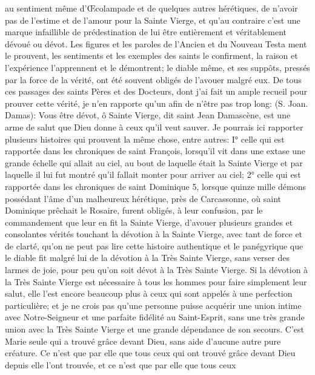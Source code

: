 au sentiment même d'Œcolampade et de quelques autres hérétiques, de n'avoir pas de l'estime et de l'amour pour
la Sainte Vierge, et qu'au contraire c'est une marque infaillible de prédestination de lui être entièrement et
véritablement dévoué ou dévot.
 Les figures et les paroles de l'Ancien et du Nouveau Testa ment le prouvent, les sentiments et les exemples
des saints le confirment, la raison et l'expérience l'apprennent et le démontrent; le diable même, et ses suppôts,
pressés par la force de la vérité, ont été souvent obligés de l'avouer malgré eux. De tous ces passages des saints
Pères et des Docteurs, dont j'ai fait un ample recueil pour prouver cette vérité, je n'en rapporte qu'un afin de n'être
pas trop long:  (S. Joan.
Damas): Vous être dévot, ô Sainte Vierge, dit saint Jean Damascène, est une arme de salut que Dieu donne à
ceux qu'il veut sauver.
 Je pourrais ici rapporter plusieurs histoires qui prouvent la même chose, entre autres: I° celle qui est rapportée
dans les chroniques de saint François, lorsqu'il vit dans une extase une grande échelle qui allait au ciel, au bout de
laquelle était la Sainte Vierge et par laquelle il lui fut montré qu'il fallait monter pour arriver au ciel; 2° celle qui est
rapportée dans les chroniques de saint Dominique 5, lorsque quinze mille démons possédant l'âme d'un
malheureux hérétique, près de Carcassonne, où saint Dominique prêchait le Rosaire, furent obligés, à leur
confusion, par le commandement que leur en fit la Sainte Vierge, d'avouer plusieurs grandes et consolantes
vérités touchant la dévotion à la Sainte Vierge, avec tant de force et de clarté, qu'on ne peut pas lire cette histoire
authentique et le panégyrique que le diable fit malgré lui de la dévotion à la Très Sainte Vierge, sans verser des
larmes de joie, pour peu qu'on soit dévot à la Très Sainte Vierge.
 Si la dévotion à la Très Sainte Vierge est nécessaire à tous les hommes pour faire simplement leur salut, elle
l'est encore beaucoup plus à ceux qui sont appelés à une perfection particulière; et je ne crois pas qu'une
personne puisse acquérir une union intime avec Notre-Seigneur et une parfaite fidélité au Saint-Esprit, sans une
très grande union avec la Très Sainte Vierge et une grande dépendance de son secours.
 C'est Marie seule qui a trouvé grâce devant Dieu, sans aide d'aucune autre pure créature. Ce n'est que par
elle que tous ceux qui ont trouvé grâce devant Dieu depuis elle l'ont trouvée, et ce n'est que par elle que tous ceux

